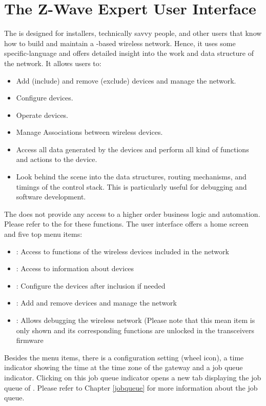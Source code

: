 \chapter {The Z-Wave Expert User Interface}
\label{expertuserinterface}
\label{eui}

The \zweui is designed for installers, technically savvy people, 
and other users that know how to build and maintain a \zwave-based wireless network.
Hence, it uses some \zwave specific-language and offers detailed insight into the work 
and data structure of the \zwave network. It allows users to:

\begin{itemize}
\item Add (include) and remove (exclude) \zwave devices and manage the network.
\item Configure \zwave devices.
\item Operate \zwave devices.
\item Manage Associations between wireless devices.
\item Access all data generated by the devices and perform all kind of functions and actions to the device.
\item Look behind the scene into the data structures, routing mechanisms, and timings of 
the \zwave control stack. This is particularly useful for debugging and software development.
\end{itemize}
The \zweui does not provide any access to a higher order business logic and 
automation. Please refer to the \zwshui for these functions. 
The user interface offers a home screen and five top menu items:

\begin{itemize}
\item {}: Access to functions of the wireless devices included in the network
\item {}: Access to information about devices
\item {}: Configure the devices after inclusion if needed
\item {}: Add and remove devices and manage the network
\item {}: Allows debugging the wireless network (Please note that this mean item 
is only shown and its corresponding functions are unlocked in the transceivers firmware
\end{itemize}

Besides the menu items, there is a configuration setting (wheel icon), a time indicator 
showing the time at the time zone of the gateway and a job queue indicator. Clicking on this 
job queue indicator opens a new tab displaying the job queue of \zway. Please refer to 
Chapter \ref{jobqueue} for more information about the job queue.

